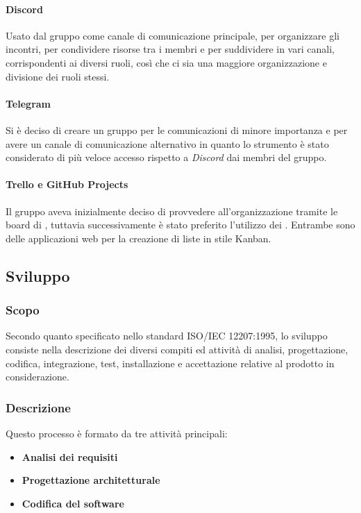 \paragraph{Discord}

Usato dal gruppo come canale di comunicazione principale, per organizzare gli incontri, per condividere risorse tra i 
membri e per suddividere in vari canali, corrispondenti ai diversi ruoli, così che ci sia una maggiore organizzazione e 
divisione dei ruoli stessi.

\paragraph{Telegram}

Si è deciso di creare un gruppo  per le comunicazioni di minore importanza e per avere un canale di 
comunicazione alternativo in quanto lo strumento è stato considerato di più veloce accesso rispetto a \emph{Discord} 
dai membri del gruppo.

\paragraph{Trello e GitHub Projects}

Il gruppo aveva inizialmente deciso di provvedere all'organizzazione tramite le board di , tuttavia 
successivamente è stato preferito l'utilizzo dei . Entrambe sono delle applicazioni web per 
la creazione di liste in stile Kanban.

\subsection{Sviluppo}

\subsubsection{Scopo}

Secondo quanto specificato nello standard \textsc{ISO/IEC  12207:1995}, lo sviluppo consiste nella descrizione dei 
diversi compiti ed attività di analisi, progettazione, codifica, integrazione, test, installazione e accettazione 
relative al prodotto in considerazione.

\subsubsection{Descrizione}

Questo processo è formato da tre attività principali:
\begin{itemize}
    \item \textbf{Analisi dei requisiti}
    \item \textbf{Progettazione architetturale}
    \item \textbf{Codifica del software}
\end{itemize}

